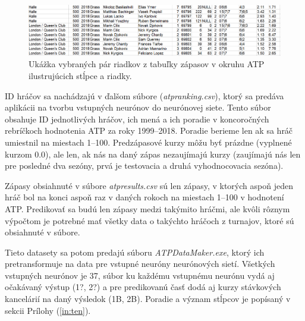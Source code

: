 \noindent
\begin{figure}
\includegraphics[width=\textwidth]{../img/atp.png}
\caption{Ukážka vybraných pár riadkov z tabuľky zápasov v okruhu ATP ilustrujúcich stĺpce a riadky.}
\end{figure}

ID hráčov sa nachádzajú v ďalšom súbore (\textit{atpranking.csv}), ktorý sa predáva aplikácii na tvorbu vstupných neurónov do neurónovej siete.
Tento súbor obsahuje ID jednotlivých hráčov, ich mená a ich poradie v koncoročných rebríčkoch hodnotenia ATP za roky 1999--2018.
Poradie berieme len ak sa hráč umiestnil na miestach 1--100.
Predzápasové kurzy môžu byť prázdne (vyplnené kurzom 0.0), ale len, ak nás na daný zápas nezaujímajú kurzy (zaujímajú nás len pre posledné dva sezóny, prvá je testovacia a druhá vyhodnocovacia sezóna).

Zápasy obsiahnuté v súbore \textit{atpresults.csv} sú len zápasy, v ktorých aspoň jeden hráč bol na konci aspoň raz v daných rokoch na miestach 1--100 v hodnotení ATP.
Predikovať sa budú len zápasy medzi takýmito hráčmi, ale kvôli rôznym výpočtom je potrebné mať všetky data o takýchto hráčoch z turnajov, ktoré sú obsiahnuté v súbore.

Tieto datasety sa potom predajú súboru \textit{ATPDataMaker.exe}, ktorý ich pretransformuje na data pre vstupné neuróny neurónových sietí. Všetkých vstupných neurónov je 37, súbor ku každému vstupnému neurónu vydá aj očakávaný výstup (1?, 2?) a pre predikovanú časť dodá aj kurzy stávkových kancelárií na daný výsledok (1B, 2B).
Poradie a význam stĺpcov je popísaný v sekcii Prílohy (\ref{in:ten}).


